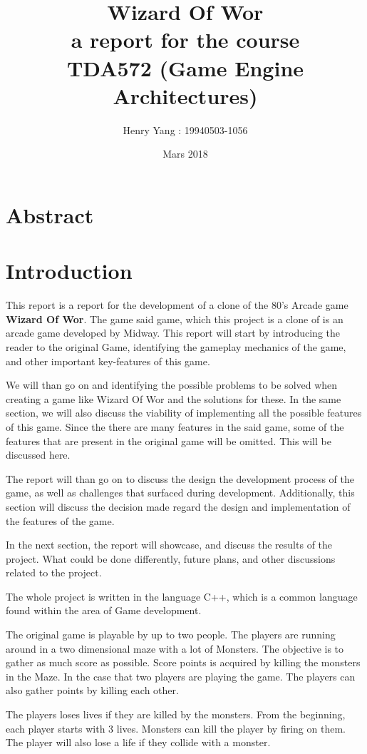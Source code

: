 \documentclass{article}
\author{Henry Yang : 19940503-1056}
\title{Wizard Of Wor \\\large a report for the course \\TDA572 (Game Engine Architectures)}
\date{Mars 2018}
\begin{document}
  \maketitle
  \section*{Abstract}
  \section{Introduction}

  This report is a report for the development of a clone of the 80's Arcade game \textbf{Wizard Of Wor}. The game said game, which this project is a clone of is an arcade game developed by Midway. This report will start by introducing the reader to the original Game, identifying the gameplay mechanics of the game, and other important key-features of this game.

  We will than go on and identifying the possible problems to be solved when creating a game like Wizard Of Wor and the solutions for these. In the same section, we will also discuss the viability of implementing all the possible features of this game. Since the there are many features in the said game, some of the features that are present in the original game will be omitted. This will be discussed here.

  The report will than go on to discuss the design the development process of the game, as well as challenges that surfaced during development. Additionally, this section will discuss the decision made regard the design and implementation of the features of the game.

  In the next section, the report will showcase, and discuss the results of the project. What could be done differently, future plans, and other discussions related to the project.

  The whole project is written in the language C++, which is a common language found within the area of Game development.

  The original game is playable by up to two people. The players are running around in a two dimensional maze with a lot of Monsters. The objective is to gather as much score as possible. Score points is acquired by killing the monsters in the Maze. In the case that two players are playing the game. The players can also gather points by killing each other.

  The players loses lives if they are killed by the monsters. From the beginning, each player starts with 3 lives. Monsters can kill the player by firing on them. The player will also lose a life if they collide with a monster.
\end{document}
